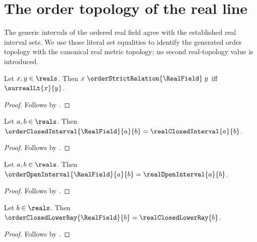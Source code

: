 \section{The order topology of the real line}






The generic intervals of the ordered real field agree with the established
real interval sets.  We use those literal set equalities to identify the
generated order topology with the canonical real metric topology; no second
real-topology value is introduced.

\begin{proposition}\label{real_field_order_strict_iff}
    Let $x,y\in\reals$.
    Then $x\mathrel{\orderStrictRelation{\RealField}}y$ iff
        $\surrealLt{x}{y}$.
\end{proposition}
\begin{proof}
    Follows by
        .
\end{proof}

\begin{proposition}\label{real_order_closed_interval_eq}
    Let $a,b\in\reals$.
    Then $\orderClosedInterval{\RealField}{a}{b}
        =\realClosedInterval{a}{b}$.
\end{proposition}
\begin{proof}
    Follows by
        .
\end{proof}

\begin{proposition}\label{real_order_open_interval_eq}
    Let $a,b\in\reals$.
    Then $\orderOpenInterval{\RealField}{a}{b}
        =\realOpenInterval{a}{b}$.
\end{proposition}
\begin{proof}
    Follows by
        .
\end{proof}

\begin{proposition}\label{real_order_closed_lower_ray_eq}
    Let $b\in\reals$.
    Then $\orderClosedLowerRay{\RealField}{b}
        =\realClosedLowerRay{b}$.
\end{proposition}
\begin{proof}
    Follows by
        .
\end{proof}

